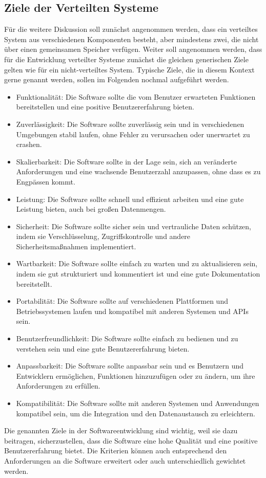 \documentclass[../vs-script-first-v01.tex]{subfiles}
\begin{document}
\subsection{Ziele der Verteilten Systeme}
Für die weitere Diskussion soll zunächst angenommen werden, dass ein verteiltes System aus verschiedenen Komponenten besteht, aber mindestens zwei, die nicht über einen gemeinsamen Speicher verfügen. Weiter soll angenommen werden, dass für die Entwicklung verteilter Systeme zunächst die gleichen generischen Ziele gelten wie für ein nicht-verteiltes System. Typische Ziele, die in diesem Kontext gerne genannt werden, sollen im Folgenden nochmal aufgeführt werden.
\begin{itemize}
\item Funktionalität: Die Software sollte die vom Benutzer erwarteten Funktionen bereitstellen und eine positive Benutzererfahrung bieten.
\item Zuverlässigkeit: Die Software sollte zuverlässig sein und in verschiedenen Umgebungen stabil laufen, ohne Fehler zu verursachen oder unerwartet zu crashen.
\item Skalierbarkeit: Die Software sollte in der Lage sein, sich an veränderte Anforderungen und eine wachsende Benutzerzahl anzupassen, ohne dass es zu Engpässen kommt.
\item Leistung: Die Software sollte schnell und effizient arbeiten und eine gute Leistung bieten, auch bei großen Datenmengen.
\item Sicherheit: Die Software sollte sicher sein und vertrauliche Daten schützen, indem sie Verschlüsselung, Zugriffskontrolle und andere Sicherheitsmaßnahmen implementiert.
\item Wartbarkeit: Die Software sollte einfach zu warten und zu aktualisieren sein, indem sie gut strukturiert und kommentiert ist und eine gute Dokumentation bereitstellt.
\item Portabilität: Die Software sollte auf verschiedenen Plattformen und Betriebssystemen laufen und kompatibel mit anderen Systemen und APIs sein.
\item Benutzerfreundlichkeit: Die Software sollte einfach zu bedienen und zu verstehen sein und eine gute Benutzererfahrung bieten.
\item Anpassbarkeit: Die Software sollte anpassbar sein und es Benutzern und Entwicklern ermöglichen, Funktionen hinzuzufügen oder zu ändern, um ihre Anforderungen zu erfüllen.
\item Kompatibilität: Die Software sollte mit anderen Systemen und Anwendungen kompatibel sein, um die Integration und den Datenaustausch zu erleichtern.
\end{itemize}   
Die genannten Ziele in der Softwareentwicklung sind wichtig, weil sie dazu beitragen, sicherzustellen, dass die Software eine hohe Qualität und eine positive Benutzererfahrung bietet. Die Kriterien können auch entsprechend den Anforderungen an die Software erweitert oder auch unterschiedlich gewichtet werden. 
\end{document}
